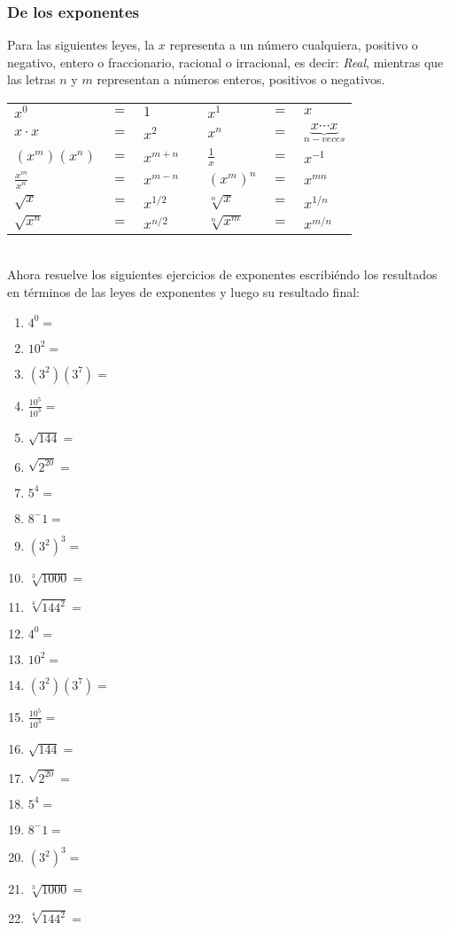 \documentclass[11pt,twocolumn]{article} %
\begin{document}
\subsubsection{De los exponentes}
Para las siguientes leyes, la $x$ representa a un número cualquiera, positivo o negativo, entero o fraccionario, racional o irracional, es decir: \emph{Real}, mientras que las letras $n$ y $m$ representan a números enteros, positivos o negativos.
\begin{tabular}{|lcl|c|lcl|}
\hline
$x^0$     & $=$ & $1$   & & $x^1$ & $=$ & $x$ \\
$x \cdot x$ & $=$ & $x^2$ & & $x^n$ & $=$ & $\underbrace{x\cdots x}_{n-veces}$ \\
$(x^m)(x^n)$ & $=$ & $x^{m+n}$ & & $\frac{1}{x}$ & $=$ & $x^{-1}$ \\
$\frac{x^m}{x^n}$ & $=$ & $x^{m-n}$ & & $(x^m)^n$ & $=$ & $x^{mn}$ \\
$\sqrt{x}$ & $=$ & $x^{1/2}$ & & $\sqrt[n]{x}$ & $=$ & $x^{1/n}$ \\
$\sqrt{x^n}$ & $=$ & $x^{n/2}$ & & $\sqrt[n]{x^m}$ & $=$ & $x^{m/n}$ \\
\hline
\end{tabular}\\

Ahora resuelve los siguientes ejercicios de exponentes escribiéndo los resultados en términos de las leyes de exponentes y luego su resultado final:
\begin{enumerate}
\item $4^0=$
\item $10^2=$
\item $(3^2)(3^7)=$
\item $\frac{10^5}{10^3}=$
\item $\sqrt{144}=$
\item $\sqrt{2^20}=$
\item $5^4=$
\item $8^-1=$
\item $(3^2)^3=$
\item $\sqrt[3]{1000}=$
\item $\sqrt[4]{144^2}=$
\item $4^0=$
\item $10^2=$
\item $(3^2)(3^7)=$
\item $\frac{10^5}{10^3}=$
\item $\sqrt{144}=$
\item $\sqrt{2^20}=$
\item $5^4=$
\item $8^-1=$
\item $(3^2)^3=$
\item $\sqrt[3]{1000}=$
\item $\sqrt[4]{144^2}=$
\end{enumerate}
\end{document}

